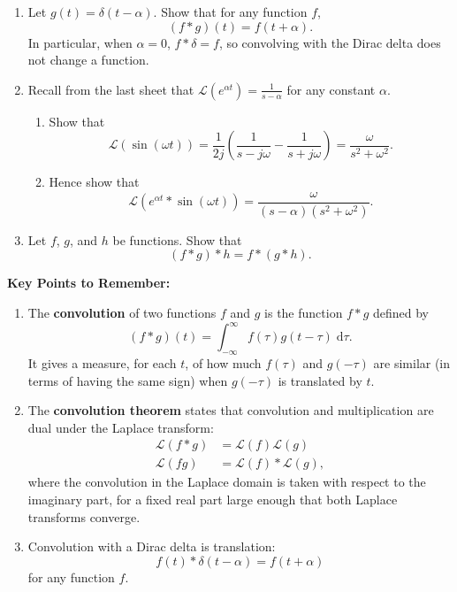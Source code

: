 \documentclass{article}
\newcommand{\diff}{\;\mathrm{d}}
\begin{document}
\begin{enumerate}
	\item Let $g(t)=\delta(t-\alpha)$. Show that for any function $f$,
		\[(f\ast g)(t)=f(t+\alpha).\]
		In particular, when $\alpha=0$, $f\ast \delta=f$, so convolving with the Dirac delta does not change a function.
	\item Recall from the last sheet that $\mathcal{L}(e^{\alpha t})=\frac{1}{s-\alpha}$ for any constant $\alpha$.
		\begin{enumerate}
			\item Show that
				\[\mathcal{L}(\sin(\omega t))=\frac{1}{2j}\left(\frac{1}{s-j\omega}-\frac{1}{s+j\omega}\right)=\frac{\omega}{s^2+\omega^2}.\]
			\item Hence show that
				\[\mathcal{L}\left(e^{\alpha t}\ast\sin(\omega t)\right) = \frac{\omega}{(s-\alpha)(s^2+\omega^2)}.\]
		\end{enumerate}
	\item Let $f$, $g$, and $h$ be functions. Show that
		\[(f\ast g)\ast h = f\ast(g\ast h).\]
\end{enumerate}















\clearpage




{\bf Key Points to Remember:}

\vspace{5mm}

\begin{enumerate}
	\item The \textbf{convolution} of two functions $f$ and $g$ is the function $f\ast g$ defined by
		\[(f\ast g)(t)=\int_{-\infty}^\infty f(\tau)g(t-\tau)\diff \tau.\]
		It gives a measure, for each $t$, of how much $f(\tau)$ and $g(-\tau)$ are similar (in terms of having the same sign) when $g(-\tau)$ is translated by $t$.
	\item The \textbf{convolution theorem} states that convolution and multiplication are dual under the Laplace transform:
		\begin{align*}
			\mathcal{L}(f\ast g) &= \mathcal{L}(f)\mathcal{L}(g)\\
			\mathcal{L}(fg)&=\mathcal{L}(f)\ast \mathcal{L}(g),
		\end{align*}
		where the convolution in the Laplace domain is taken with respect to the imaginary part, for a fixed real part large enough that both Laplace transforms converge.
	\item Convolution with a Dirac delta is translation:
		\[f(t)\ast \delta(t-\alpha) = f(t+\alpha)\]
		for any function $f$.
\end{enumerate}
\end{document}
